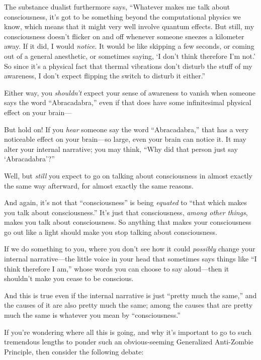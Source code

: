 {
 The substance dualist furthermore says,
``Whatever makes me talk about consciousness,
it's got to be something beyond the computational
physics we know, which means that it might very well involve quantum
effects. But still, my consciousness doesn't flicker on
and off whenever someone sneezes a kilometer away. If it did, I would
\textit{notice}. It would be like skipping a few seconds, or coming out
of a general anesthetic, or sometimes saying, `I
don't think therefore I'm
not.' So since it's a physical fact
that thermal vibrations don't disturb the stuff of my
awareness, I don't expect flipping the switch to
disturb it either.''}

{
 Either way, you \textit{shouldn't} expect your
sense of awareness to vanish when someone says the word
``Abracadabra,'' even if that does
have some infinitesimal physical effect on your brain---}

{
 But hold on! If you \textit{hear} someone say the word
``Abracadabra,'' that has a very
noticeable effect on your brain---so large, even your brain can notice
it. It may alter your internal narrative; you may think,
``Why did that person just say
`Abracadabra'?''}

{
 Well, but \textit{still} you expect to go on talking about
consciousness in almost exactly the same way afterward, for almost
exactly the same reasons.}

{
 And again, it's not that
``consciousness'' is being
\textit{equated} to ``that which makes you talk about
consciousness.'' It's just that
consciousness, \textit{among other things}, makes you talk about
consciousness. So anything that makes your consciousness go out like a
light should make you stop talking about consciousness.}

{
 If we do something to you, where you don't see how
it could \textit{possibly} change your internal narrative---the little
voice in your head that sometimes says things like ``I
think therefore I am,'' whose words you can choose to
say aloud---then it shouldn't make you cease to be
conscious.}

{
 And this is true even if the internal narrative is just
``pretty much the same,'' and the
causes of it are also pretty much the same; among the causes that are
pretty much the same is whatever you mean by
``consciousness.''}

{
 If you're wondering where all this is going, and
why it's important to go to such tremendous lengths to
ponder such an obvious-seeming Generalized Anti-Zombie Principle, then
consider the following debate:}

